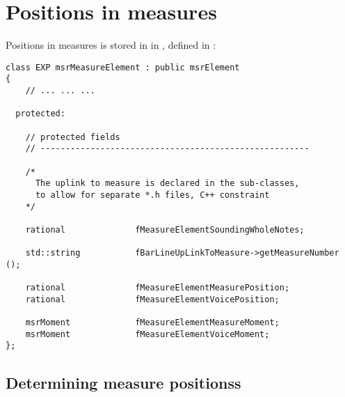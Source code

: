 

\chapter{Positions in measures}

Positions in measures is stored in  in , defined in :
\begin{lstlisting}[language=CPlusPlus]
class EXP msrMeasureElement : public msrElement
{
	// ... ... ...

  protected:

    // protected fields
    // ------------------------------------------------------

    /*
      The uplink to measure is declared in the sub-classes,
      to allow for separate *.h files, C++ constraint
    */

    rational              fMeasureElementSoundingWholeNotes;

    std::string           fBarLineUpLinkToMeasure->getMeasureNumber ();

    rational              fMeasureElementMeasurePosition;
    rational              fMeasureElementVoicePosition;

    msrMoment             fMeasureElementMeasureMoment;
    msrMoment             fMeasureElementVoiceMoment;
};
\end{lstlisting}

\section{Determining measure positionss}

